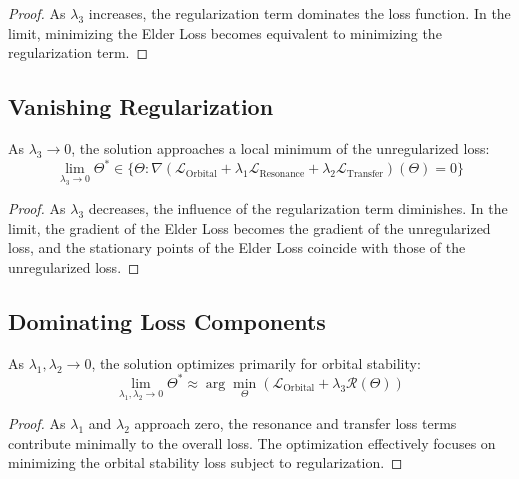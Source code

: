 \begin{proof}
As $\lambda_3$ increases, the regularization term dominates the loss function. In the limit, minimizing the Elder Loss becomes equivalent to minimizing the regularization term.
\end{proof}

\subsection{Vanishing Regularization}

\begin{theorem}
As $\lambda_3 \to 0$, the solution approaches a local minimum of the unregularized loss:
\begin{equation}
\lim_{\lambda_3 \to 0} \Theta^* \in \{\Theta : \nabla(\mathcal{L}_{\text{Orbital}} + \lambda_1 \mathcal{L}_{\text{Resonance}} + \lambda_2 \mathcal{L}_{\text{Transfer}})(\Theta) = 0\}
\end{equation}
\end{theorem}

\begin{proof}
As $\lambda_3$ decreases, the influence of the regularization term diminishes. In the limit, the gradient of the Elder Loss becomes the gradient of the unregularized loss, and the stationary points of the Elder Loss coincide with those of the unregularized loss.
\end{proof}

\subsection{Dominating Loss Components}

\begin{theorem}
As $\lambda_1, \lambda_2 \to 0$, the solution optimizes primarily for orbital stability:
\begin{equation}
\lim_{\lambda_1, \lambda_2 \to 0} \Theta^* \approx \arg\min_\Theta (\mathcal{L}_{\text{Orbital}} + \lambda_3 \mathcal{R}(\Theta))
\end{equation}
\end{theorem}

\begin{proof}
As $\lambda_1$ and $\lambda_2$ approach zero, the resonance and transfer loss terms contribute minimally to the overall loss. The optimization effectively focuses on minimizing the orbital stability loss subject to regularization.
\end{proof}

